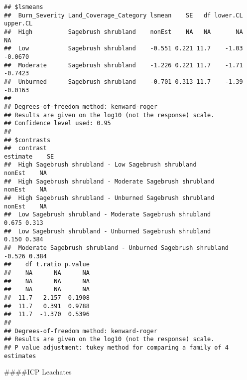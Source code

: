 \documentclass[
]{article}
\begin{document}
\begin{verbatim}
## $lsmeans
##  Burn_Severity Land_Coverage_Category lsmean    SE   df lower.CL upper.CL
##  High          Sagebrush shrubland    nonEst    NA   NA       NA       NA
##  Low           Sagebrush shrubland    -0.551 0.221 11.7    -1.03  -0.0670
##  Moderate      Sagebrush shrubland    -1.226 0.221 11.7    -1.71  -0.7423
##  Unburned      Sagebrush shrubland    -0.701 0.313 11.7    -1.39  -0.0163
## 
## Degrees-of-freedom method: kenward-roger 
## Results are given on the log10 (not the response) scale. 
## Confidence level used: 0.95 
## 
## $contrasts
##  contrast                                                    estimate    SE
##  High Sagebrush shrubland - Low Sagebrush shrubland            nonEst    NA
##  High Sagebrush shrubland - Moderate Sagebrush shrubland       nonEst    NA
##  High Sagebrush shrubland - Unburned Sagebrush shrubland       nonEst    NA
##  Low Sagebrush shrubland - Moderate Sagebrush shrubland         0.675 0.313
##  Low Sagebrush shrubland - Unburned Sagebrush shrubland         0.150 0.384
##  Moderate Sagebrush shrubland - Unburned Sagebrush shrubland   -0.526 0.384
##    df t.ratio p.value
##    NA      NA      NA
##    NA      NA      NA
##    NA      NA      NA
##  11.7   2.157  0.1908
##  11.7   0.391  0.9788
##  11.7  -1.370  0.5396
## 
## Degrees-of-freedom method: kenward-roger 
## Results are given on the log10 (not the response) scale. 
## P value adjustment: tukey method for comparing a family of 4 estimates
\end{verbatim}

\#\#\#\#ICP Leachates
\end{document}
